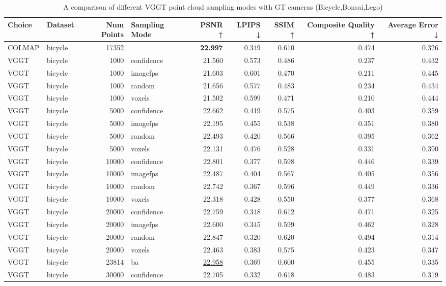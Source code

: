 \begin{table}[H]
\caption{A comparison of different VGGT point cloud sampling modes with GT cameras (Bicycle,Bonsai,Lego)}
\label{tab:03_sampling_mode_gt_cams_bicycle,bonsai,lego}
\small
\begin{tabular}{llrlrrrrr}
\toprule
Choice & Dataset & Num Points & Sampling Mode & PSNR ↑ & LPIPS ↓ & SSIM ↑ & Composite Quality ↑ & Average Error ↓ \\
\midrule
COLMAP & bicycle & 17352 &  & \textbf{22.997} & 0.349 & 0.610 & 0.474 & 0.326 \\
VGGT & bicycle & 1000 & confidence & 21.560 & 0.573 & 0.486 & 0.237 & 0.432 \\
VGGT & bicycle & 1000 & imagefps & 21.603 & 0.601 & 0.470 & 0.211 & 0.445 \\
VGGT & bicycle & 1000 & random & 21.656 & 0.577 & 0.483 & 0.234 & 0.434 \\
VGGT & bicycle & 1000 & voxels & 21.502 & 0.599 & 0.471 & 0.210 & 0.444 \\
VGGT & bicycle & 5000 & confidence & 22.662 & 0.419 & 0.575 & 0.403 & 0.359 \\
VGGT & bicycle & 5000 & imagefps & 22.195 & 0.455 & 0.538 & 0.351 & 0.380 \\
VGGT & bicycle & 5000 & random & 22.493 & 0.420 & 0.566 & 0.395 & 0.362 \\
VGGT & bicycle & 5000 & voxels & 22.131 & 0.476 & 0.528 & 0.331 & 0.390 \\
VGGT & bicycle & 10000 & confidence & 22.801 & 0.377 & 0.598 & 0.446 & 0.339 \\
VGGT & bicycle & 10000 & imagefps & 22.487 & 0.404 & 0.567 & 0.405 & 0.356 \\
VGGT & bicycle & 10000 & random & 22.742 & 0.367 & 0.596 & 0.449 & 0.336 \\
VGGT & bicycle & 10000 & voxels & 22.318 & 0.428 & 0.550 & 0.377 & 0.368 \\
VGGT & bicycle & 20000 & confidence & 22.759 & 0.348 & 0.612 & 0.471 & 0.325 \\
VGGT & bicycle & 20000 & imagefps & 22.600 & 0.345 & 0.599 & 0.462 & 0.328 \\
VGGT & bicycle & 20000 & random & 22.847 & 0.320 & 0.620 & 0.494 & 0.314 \\
VGGT & bicycle & 20000 & voxels & 22.463 & 0.383 & 0.575 & 0.423 & 0.347 \\
VGGT & bicycle & 23814 & ba & \underline{22.958} & 0.369 & 0.600 & 0.455 & 0.335 \\
VGGT & bicycle & 30000 & confidence & 22.705 & 0.332 & 0.618 & 0.483 & 0.319 \\

\end{tabular}
\end{table}
